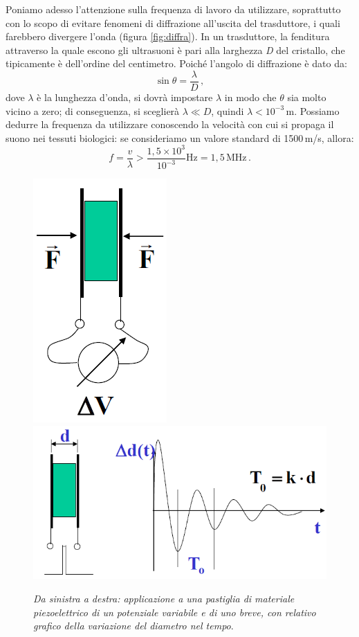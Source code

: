 \documentclass{report}
\newcommand{\figref}[1]{figura \ref{#1}}
\numberwithin{equation}{section}
\numberwithin{figure}{section}
\begin{document}
Poniamo adesso l'attenzione sulla frequenza di lavoro da utilizzare, soprattutto con lo scopo di evitare fenomeni di diffrazione all'uscita del trasduttore, i quali farebbero divergere l'onda (\figref{fig:diffra}). In un trasduttore, la fenditura attraverso la quale escono gli ultrasuoni è pari alla larghezza \textit{D} del cristallo, che tipicamente è dell'ordine del centimetro. Poiché l'angolo di diffrazione è dato da:
\begin{equation}
    \sin{\theta} = \frac{\lambda}{D}\,,
\end{equation}
dove $\lambda$ è la lunghezza d'onda, si dovrà impostare $\lambda$ in modo che $\theta$ sia molto vicino a zero; di conseguenza, si sceglierà $\lambda \ll D$, quindi $\lambda < 10^{-3}$\,m. Possiamo dedurre la frequenza da utilizzare conoscendo la velocità con cui si propaga il suono nei tessuti biologici: se consideriamo un valore standard di 1500\,m/s, allora:
\begin{equation*}
    f = \frac{v}{\lambda} > \frac{1,5 \times 10^3}{10^{-3}} \text{Hz} = 1,5\,\text{MHz}\,.
\end{equation*}

\begin{figure}[htp]
\centering
\includegraphics[scale=0.77]{immagini/piezo.png}\quad\includegraphics[scale=0.85]{immagini/piezo2.png}
\caption{\label{fig:piezo} \textit{Da sinistra a destra: applicazione a una pastiglia di materiale piezoelettrico di un potenziale variabile e di uno breve, con relativo grafico della variazione del diametro nel tempo}.}
\end{figure}
\end{document}

